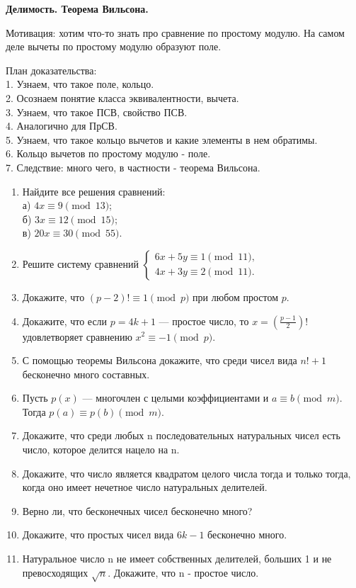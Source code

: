 \documentclass[a4paper,12pt]{article}
\begin{document}
\begin{center}
    {\Large \textbf{Делимость. Теорема Вильсона.}}\\[0.5em]
\end{center}
\noindent Мотивация: хотим что-то знать про сравнение по простому модулю. На самом деле вычеты по простому модулю образуют поле.

\noindent План доказательства: \\
1. Узнаем, что такое поле, кольцо. \\
2. Осознаем понятие класса эквивалентности, вычета. \\
3. Узнаем, что такое ПСВ, свойство ПСВ. \\
4. Аналогично для ПрСВ. \\
5. Узнаем, что такое кольцо вычетов и какие элементы в нем обратимы. \\
6. Кольцо вычетов по простому модулю - поле. \\
7. Следствие: много чего, в частности - теорема Вильсона.

    
\begin{enumerate}[label=\textbf{Задача \arabic*.}]
\item Найдите все решения сравнений: \\ 
а) $4x \equiv 9 \pmod{13}$; \\ 
б) $3x \equiv 12 \pmod{15}$; \\
в) $20x \equiv 30 \pmod{55}$. \\
\item Решите систему сравнений $\begin{cases} 6x + 5y \equiv 1 \pmod{11}, \\ 4x + 3y \equiv 2 \pmod{11}. \end{cases}$
\item Докажите, что $(p - 2)! \equiv 1 \pmod{p}$ при любом простом $p$. \\
\item Докажите, что если $p = 4k + 1$ — простое число, то $x = \left(\frac{p-1}{2} \right)!$ удовлетворяет сравнению $x^2 \equiv -1 \pmod{p}$. \\
\item С помощью теоремы Вильсона докажите, что среди чисел вида $n! + 1$ бесконечно много составных.
\item Пусть $p(x)$ — многочлен с целыми коэффициентами и $a \equiv b \pmod{m}$. Тогда $p(a) \equiv p(b) \pmod{m}$.
\item Докажите, что среди любых n последовательных натуральных чисел есть число, которое делится нацело на n.
\item Докажите, что число является квадратом целого числа тогда и только тогда, когда оно имеет нечетное число натуральных делителей.
\item Верно ли, что бесконечных чисел бесконечно много?
\item Докажите, что простых чисел вида $6k - 1$ бесконечно много.
\item Натуральное число n не имеет собственных делителей, больших 1 и не превосходящих $\sqrt{n}$. Докажите, что n - простое число.
\end{enumerate}
\end{document}
